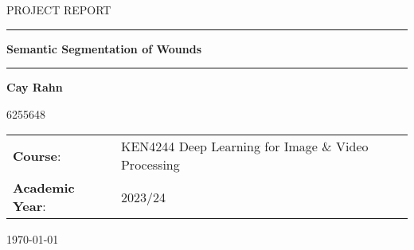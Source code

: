 \documentclass[parskip=half, headings=normal]{scrarticle}
\begin{document}
\begin{titlepage}
	\thispagestyle{empty}
	\centering

	\begin{minipage}[t]{\textwidth}
	
		\centering
		\Large{\uppercase{Project report}}
	
		\vspace{2cm}
	
		\rule{\textwidth}{1pt}
	
		\vspace{0.5cm}
	
		\textbf{\huge{Semantic Segmentation of Wounds}}
	
		\rule{\textwidth}{1pt}
	
		\vspace{5cm}
	\end{minipage}
	
	\begin{minipage}[t]{0.8\textwidth}
		\centering
	
		\large{\textbf{Cay Rahn}}
	
		\large{6255648}

		\vspace{3cm}
	
		\large{
			\noindent\begin{tabular}{@{}ll}
			\textbf{Course}:& KEN4244 Deep Learning for Image \& Video Processing\\
			\textbf{Academic Year}:& 2023/24
			\end{tabular}
		}
		
		\vspace{4cm}
		\large{\today}
	\end{minipage}
	
	
\end{titlepage}
\clearpage
\setcounter{page}{1}








\printbibliography
\end{document}
